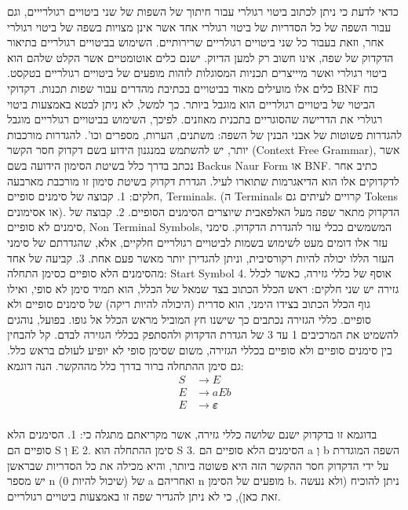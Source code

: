      כדאי לדעת כי ניתן לכתוב ביטוי רגולרי עבור חיתוך של השפות של שני ביטויים
      רגולרייים, וגם עבור השפה של כל הסדריות של ביטוי רגולרי אחד אשר אינן מצויות בשפה
      של ביטוי רגולרי אחר, וזאת בעבור כל שני ביטויים רגולריים שרירותיים. השימוש
      בביטויים רגולריים בתיאור הדקדוק של שפה, אינו חשוב רק למען הדיוק. ישנם כלים
      אוטומטיים אשר הקלט שלהם הוא ביטוי רגולרי ואשר מיייצרים תכניות המסוגלות לזהות
      מופעים של ביטויים רגולריים בטקסט. כלים אלו מועילים מאוד בביטויים בכתיבת מהדרים
      עבור שפות תכנות.
      דקדוקי BNF
      כוח הביטוי של ביטויים רגולריים הוא מוגבל ביותר. כך למשל, לא ניתן לבטא באמצעות
      ביטוי רגולרי את הדרישה שהסוגריים בתכנית מאוזנים. לפיכך, השימוש בביטויים
      רגולריים מוגבל להגדרות פשוטות של אבני הבנין של השפה: משתנים, הערות, מספרים
      וכו'. להגדרות מורכבות יותר, יש להשתמש במנגנון הידוע בשם דקדוק חסר הקשר
      (Context Free Grammar), אשר נכתב בדרך כלל בשיטת הסימון הידועה בשם Backus Naur
      Form או BNF. כתיב אחר לדקדוקים אלו הוא הדיאגרמות שתוארו לעיל.
      הגדרת דקדוק בשיטת סימון זו מורכבת מארבעה חלקים:
      1. קבוצה של סימנים סופיים, Terminals. (ה Terminals קרויים
      לעיתים גם Tokens או אסימונים). הדקדוק מתאר שפה מעל האלפאבית
      שיוצרים הסימנים הסופיים.
      2. קבוצה של סימנים לא סופיים, Non Terminal Symbols, המשמשים
      ככלי עזר להגדרת הדקדוק. סימני עזר אלו דומים מעט לשימוש בשמות
      לביטויים רגולריים חלקיים, אלא, שהגדרתם של סימני העזר הללו
      יכולה להיות רקורסיבית, וניתן להגדירן יותר מאשר פעם אחת.
      3. קביעה של אחד מהסימנים הלא סופיים כסימן התחלה: Start Symbol
      4. אוסף של כללי גזירה, כאשר לכלל גזירה יש שני חלקים: ראש הכלל
      הכתוב בצד שמאל של הכלל, הוא תמיד סימן לא סופי, ואילו גוף הכלל
      הכתוב בצידו הימני, הוא סדרית (היכולה להיות ריקה) של סימנים
      סופיים ולא סופיים. כללי הגזירה נכתבים כך שישנו חץ המוביל מראש
      הכלל אל גופו. בפועל, נוהגים להשמיט את המרכיבים 1 עד 3 של
      הגדרת הדקדוק ולהסתפק בכללי הגזירה לבדם. קל להבחין בין סימנים
      סופיים ולא סופיים בכללי הגזירה, משום שסימן סופי לא יופיע
      לעולם בראש כלל. גם סימן ההתחלה ברור בדרך כלל מההקשר.
      הנה דוגמא:
      \begin{align}
        S & → E\\
        E  &→a E b\\
        E  &→ 𝜺\\
      \end{align}

      בדוגמא זו בדקדוק ישנם שלושה כללי גזירה, אשר מקריאתם מתגלה כי:
      1. הסימנים הלא סופיים הם S וְ E
      2. סימן ההתחלה הוא S
      3. הסימנים הלא סופיים הם a וְ b
      השפה המוגדרת על ידי הדקדוק חסר ההקשר הזה היא פשוטה ביותר, והיא מכילה את כל
      הסדריות שבראשן יש מספר n (שיכול להיות 0) של a ואחריהם n מופעים של הסימן b.
      ניתן להוכיח (ולא נעשה זאת כאן), כי לא ניתן להגדיר שפה זו באמצעות ביטויים
      רגולריים.

